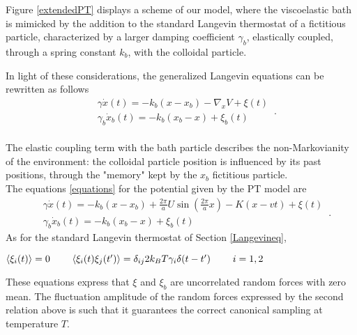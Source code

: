 Figure \ref{extendedPT} displays a scheme of our model, where the viscoelastic bath is mimicked by the addition to the standard Langevin thermostat of a fictitious particle, characterized by a larger damping coefficient $\gamma_b$, elastically coupled, through a spring constant $k_b$, with the colloidal particle.

In light of these considerations, the generalized Langevin equations can be rewritten as follows
\begin{equation} \label{equations}
    \begin{split}
        &\gamma \dot{x}(t)= -k_b (x - x_b) - \nabla_x V + \xi (t)\\
        &\gamma_b \dot{x}_b(t)= -k_b (x_b - x) + \xi_b (t)
    \end{split}\, .
\end{equation}
\\
The elastic coupling term with the bath particle describes the non-Markovianity of the environment: the colloidal particle position is influenced by its past positions, through the "memory" kept by the $x_b$ fictitious particle.
\\
The equations \eqref{equations} for the potential given by the PT model are 
\begin{equation} \label{eq_def}
    \begin{split}
        &\gamma \dot{x}(t)= -k_b (x - x_b) + \frac{2\pi}{a} U \sin \left(\frac{2\pi}{a} x \right) - K(x-vt) + \xi (t)\\
        &\gamma_b \dot{x}_b(t)= -k_b (x_b - x) + \xi_b (t)
    \end{split}\, .
\end{equation}
As for the standard Langevin thermostat of Section \ref{Langevineq},
\begin{center}
    $\langle \xi_i (t) \rangle = 0 \hspace{0.8cm}
    \langle \xi_i (t) \xi_j (t') \rangle = \delta_{ij} 2 k_B T \gamma_i \delta(t-t') \hspace{0.8cm}i=1,2
$
\end{center}
These equations express that $\xi$ and $\xi_b$ are uncorrelated random forces with zero mean. The fluctuation amplitude of the random forces expressed by the second relation above is such that it guarantees the correct canonical sampling at temperature $T$.
